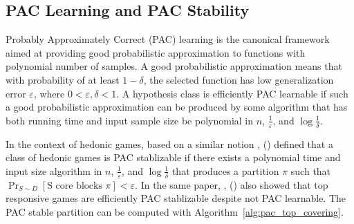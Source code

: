 \documentclass[letterpaper]{article} %
\newcommand{\citename}[1]{\citeauthor{#1}, (\citeyear{#1})}
\theoremstyle{definition}
\begin{document}
\subsection{PAC Learning and PAC Stability}
Probably Approximately Correct (PAC) learning is the canonical framework aimed at providing good probabilistic approximation to functions with polynomial number of samples. A good probabilistic approximation means that with probability of at least $1 - \delta$, the selected function has low generalization error $\varepsilon$, where $0 < \varepsilon, \delta < 1$. A hypothesis class is efficiently PAC learnable if such a good probabilistic approximation can be produced by some algorithm that has both running time and input sample size be polynomial in $n$, $\frac{1}{\varepsilon}$, and $\log{\frac{1}{\delta}}$.

In the context of hedonic games, based on a similar notion \citename{ijcai2017-380} defined that a class of hedonic games is PAC stablizable if there exists a polynomial time and input size algorithm in $n$, $\frac{1}{\varepsilon}$, and $\log{\frac{1}{\delta}}$ that produces a partition $\pi$ such that $\Pr_{S\sim D}[\text{S core blocks } \pi] < \varepsilon$. In the same paper, \citename{ijcai2017-380} also showed that top responsive games are efficiently PAC stablizable despite not PAC learnable. The PAC stable partition can be computed with Algorithm~\ref{alg:pac_top_covering}.
\end{document}
